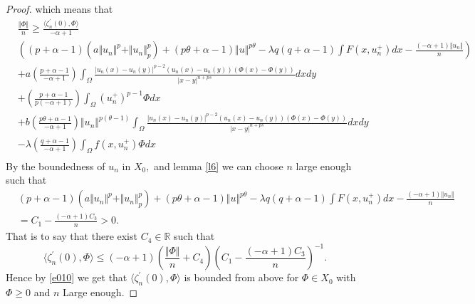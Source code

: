 \documentclass[10pt,twoside,reqno,centertags,draft]{amsart}
\begin{document}
\begin{proof}
{}
which means that
{\scriptsize
\begin{equation}
\begin{aligned}
&\frac{\Vert \Phi\Vert}{n} \geq \frac{\langle\zeta^{\prime}_n(0),\Phi \rangle}{-\alpha +1}\\
&\left( (p +\alpha -1)\left( a\Vert u_n\Vert^{p} +\Vert u_n\Vert^{p}_{p}\right) +(p\theta +\alpha -1)\Vert u\Vert^{p\theta} -\lambda q(q +\alpha -1)\int F(x,u_n^+)dx -\frac{(-\alpha +1)\Vert u_n\Vert}{n} \right)\\
& +a\left(\frac{p +\alpha -1}{-\alpha +1}\right)\int_{\Omega}\frac{\vert u_n(x) -u_n(y)\vert^{p-2}(u_n(x) -u_n(y))(\Phi(x) -\Phi(y))}{\vert x -y\vert^{n  +ps}}dxdy
\\
& +\left(\frac{p +\alpha -1}{p(-\alpha +1)}\right)\int_{\Omega}(u_n^+)^{p -1}\Phi dx\\
& +b\left( \frac{p\theta +\alpha -1}{-\alpha +1}\right)\Vert u_n\Vert^{p(\theta -1)}\int_{\Omega}\frac{\vert u_n(x) -u_n(y)\vert^{p-2}(u_n(x) -u_n(y))(\Phi(x) -\Phi(y))}{\vert x -y\vert^{n  +ps}}dxdy\\
& -\lambda\left(  \frac{q +\alpha -1}{-\alpha +1}\right)\int_{\Omega} f(x,u_n^+)\Phi dx\\
\end{aligned}
\end{equation}
}
By the boundedness of $ u_n$ in $ X_0,$ and lemma \ref{l6} we can choose $ n$ large enough such that
{\scriptsize
\begin{equation}\label{e010}
\begin{aligned}
&(p +\alpha -1)\left( a\Vert u_n\Vert^{p} +\Vert u_n\Vert^{p}_{p}\right) +(p\theta +\alpha -1)\Vert u\Vert^{p\theta} -\lambda q(q +\alpha -1)\int F(x,u_n^+)dx -\frac{(-\alpha +1)\Vert u_n\Vert}{n}\\
& = C_1 - \frac{(-\alpha +1)C_3}{n} >0.
\end{aligned}
\end{equation}
}
That is to say that there exist $ C_4 \in \mathbb{R}$  such that 
\begin{equation*}
\langle\zeta^{\prime}_n(0),\Phi \rangle \leq (-\alpha +1)\left( \frac{\Vert \Phi\Vert}{n} +C_4\right)\left( C_1 - \frac{(-\alpha +1)C_3}{n}\right)^{-1}.
\end{equation*}
Hence by \ref{e010} we get that  $ \langle\zeta^{\prime}_n(0),\Phi \rangle$ is bounded from above for $ \Phi\in X_0$ with $ \Phi \geq 0$ and $ n$ Large enough.
\end{proof}
\end{document}
